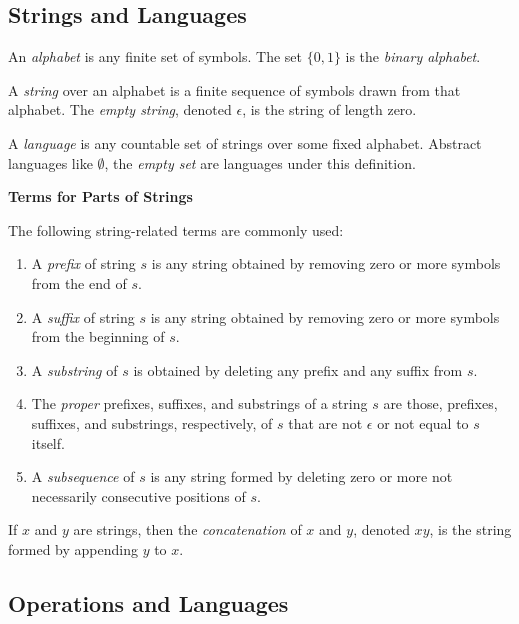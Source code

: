 \documentclass[12pt,a4paper,twoside,openany]{book}
\begin{document}
\subsection{Strings and Languages}

An \textit{alphabet} is any finite set of symbols. The set $\{0,1\}$ is the \textit{binary alphabet}.

A \textit{string} over an alphabet is a finite sequence of symbols drawn from that alphabet. The \textit{empty string}, denoted $\epsilon$, is the string of length zero.

A \textit{language} is any countable set of strings over some fixed alphabet. Abstract languages like $\emptyset$, the \textit{empty set} are languages under this definition.

\begin{framed}
    \begin{center}
        \textbf{{\large Terms for Parts of Strings}}
    \end{center}

    The following string-related terms are commonly used:
    \begin{enumerate}
        \item A \textit{prefix} of string $s$ is any string obtained by removing zero or more symbols from the end of $s$.
        \item A \textit{suffix} of string $s$ is any string obtained by removing zero or more symbols from the beginning of $s$.
        \item A \textit{substring} of $s$ is obtained by deleting any prefix and any suffix from $s$.
        \item The \textit{proper} prefixes, suffixes, and substrings of a string $s$ are those, prefixes, suffixes, and substrings, respectively, of $s$ that are not $\epsilon$ or not equal to $s$ itself.
        \item A \textit{subsequence} of $s$ is any string formed by deleting zero or more not necessarily consecutive positions of $s$.
    \end{enumerate}
\end{framed}

If $x$ and $y$ are strings, then the \textit{concatenation} of $x$ and $y$, denoted $xy$, is the string formed by appending $y$ to $x$.

\subsection{Operations and Languages}
\end{document}
